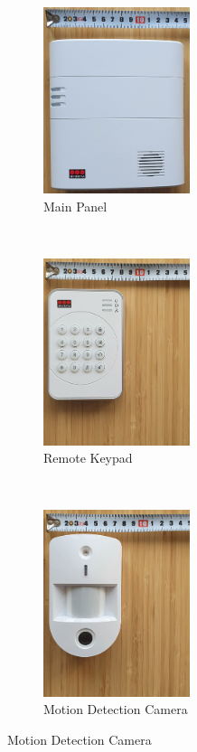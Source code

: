 \begin{figure}[!ht]
    \centering
    \begin{subfigure}[t]{0.33\textwidth}
        \includegraphics[height=2.15in]{images/3-system/main-panel.png}
        \caption{Main Panel}
        \label{fig:main-panel}
    \end{subfigure}%
    ~
    \begin{subfigure}[t]{0.33\textwidth}
        \includegraphics[height=2.15in]{images/3-system/keypad.png}
        \caption{Remote Keypad}
        \label{fig:remote-keypad}
    \end{subfigure}%
    ~
    \begin{subfigure}[t]{0.33\textwidth}
        \includegraphics[height=2.15in]{images/3-system/camera.png}
        \caption{Motion Detection Camera}
        \label{fig:motion-camera}
    \end{subfigure}
    

\end{figure}
